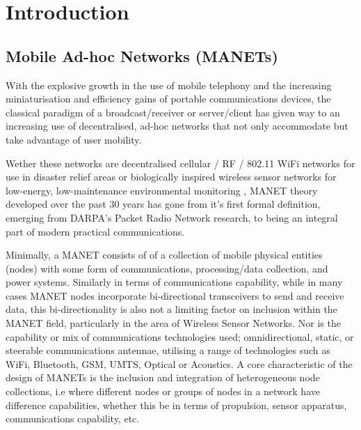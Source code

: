 \def\ChapterTitle{Introduction} %

\ifx\ifthesis\undefined

\else
\chapter{\ChapterTitle}
\label{Chapter\thechapter}
\fi

\section{Mobile Ad-hoc Networks (MANETs)}

With the explosive growth in the use of mobile telephony and the increasing miniaturisation and efficiency gains of portable communications devices, the classical paradigm of a broadcast/receiver or server/client has given way to an increasing use of decentralised, ad-hoc networks that not only accommodate but take advantage of user mobility.

Wether these networks are decentralised cellular / RF / 802.11 WiFi networks for use in disaster relief areas \cite{Milliken2015} or biologically inspired wireless sensor networks for low-energy, low-maintenance environmental monitoring \cite{Bhargavi2015}, MANET theory developed over the past 30 years has gone from it's first formal definition, emerging from DARPA's Packet Radio Network research\cite{Jubin1987}, to being an integral part of modern practical communications.

Minimally, a MANET consists of of a collection of mobile physical entities (nodes) with some form of communications, processing/data collection, and power systems. 
Similarly in terms of communications capability, while in many cases MANET nodes incorporate bi-directional transceivers to send and receive data, this bi-directionality is also not a limiting factor on inclusion within the MANET field, particularly in the area of Wireless Sensor Networks\cite{something}.
Nor is the capability or mix of communications technologies used; omnidirectional, static, or steerable communications antennae, utilising a range of technologies such as WiFi, Bluetooth, GSM, UMTS, Optical or Acoustics. 
A core characteristic of the design of MANETs is the inclusion and integration of heterogeneous node collections, i.e where different nodes or groups of nodes in a network have difference capabilities, whether this be in terms of propulsion, sensor apparatus, communications capability, etc.

